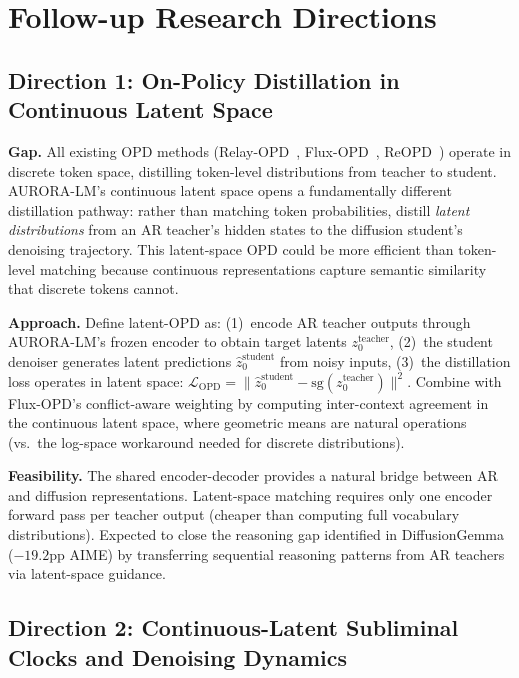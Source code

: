 \documentclass[11pt,a4paper]{article}
\begin{document}
\section{Follow-up Research Directions}

\subsection{Direction 1: On-Policy Distillation in Continuous Latent Space}

\textbf{Gap.} All existing OPD methods (Relay-OPD~\cite{relayopd2026}, Flux-OPD~\cite{fluxopd2026}, ReOPD~\cite{reopd2026}) operate in discrete token space, distilling token-level distributions from teacher to student. AURORA-LM's continuous latent space opens a fundamentally different distillation pathway: rather than matching token probabilities, distill \emph{latent distributions} from an AR teacher's hidden states to the diffusion student's denoising trajectory. This latent-space OPD could be more efficient than token-level matching because continuous representations capture semantic similarity that discrete tokens cannot.

\textbf{Approach.} Define latent-OPD as: (1)~encode AR teacher outputs through AURORA-LM's frozen encoder to obtain target latents $z_0^{\text{teacher}}$, (2)~the student denoiser generates latent predictions $\hat{z}_0^{\text{student}}$ from noisy inputs, (3)~the distillation loss operates in latent space: $\mathcal{L}_{\text{OPD}} = \| \hat{z}_0^{\text{student}} - \text{sg}(z_0^{\text{teacher}}) \|^2$. Combine with Flux-OPD's conflict-aware weighting by computing inter-context agreement in the continuous latent space, where geometric means are natural operations (vs.\ the log-space workaround needed for discrete distributions).

\textbf{Feasibility.} The shared encoder-decoder provides a natural bridge between AR and diffusion representations. Latent-space matching requires only one encoder forward pass per teacher output (cheaper than computing full vocabulary distributions). Expected to close the reasoning gap identified in DiffusionGemma ($-19.2$pp AIME) by transferring sequential reasoning patterns from AR teachers via latent-space guidance.

\subsection{Direction 2: Continuous-Latent Subliminal Clocks and Denoising Dynamics}
\end{document}
